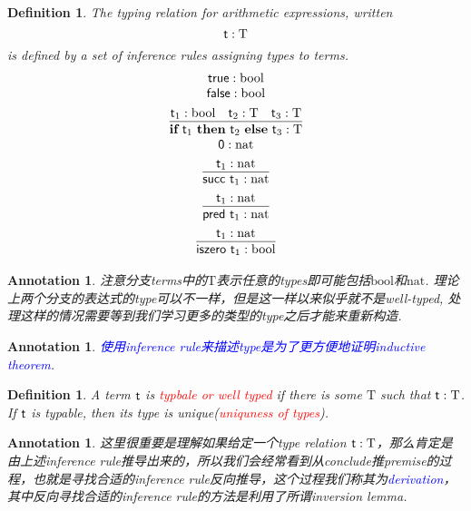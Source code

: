 \documentclass{article}
\theoremstyle{plain}
\newtheorem{definition}[theorem]{Definition}
\newtheorem{annotation}[theorem]{Annotation}
\theoremstyle{nonumberplain}
\newcommand{\termtype}[2]{\ensuremath{#1:#2}}
\newcommand{\term}[1]{\ensuremath\mathsf{#1}}
\newcommand{\true}{\term{true}}
\newcommand{\false}{\term{false}}
\newcommand{\ifelse}[3]{\ensuremath{\textbf{if}~#1~\textbf{then}~#2~\textbf{else}~#3}}
\newcommand{\succt}[1]{\term{succ}~#1}
\newcommand{\pred}[1]{\term{pred}~#1}
\newcommand{\iszero}[1]{\term{iszero}~#1}
\newcommand{\redt}[1]{\textcolor{red}{#1}}
\newcommand{\bluet}[1]{\textcolor{blue}{#1}}
\begin{document}
\begin{definition}
\rm The typing relation for arithmetic expressions, written
$$
\termtype{\term{t}}{\text{T}}
$$
is defined by a set of inference rules assigning types to terms.
$$
\begin{array}{c}
\termtype{\true}{\text{bool}} \\
\termtype{\false}{\text{bool}} \\[0.5em]
\infer{\termtype{\ifelse{\term{t}_1}{\term{t}_2}{\term{t}_3}}{\text{T}}}{\termtype{\term{t}_1}{\text{bool}} & \termtype{\term{t}_2}{\text{T}} & \termtype{\term{t}_3}{\text{T}}} \\
\termtype{\term{0}}{\text{nat}} \\[0.5em]
\infer{\termtype{\succt{\term{t}_1}}{\text{nat}}} {\termtype{\term{t}_1}{\text{nat}}}\\[0.5em]
\infer{\termtype{\pred{\term{t}_1}}{\text{nat}}} {\termtype{\term{t}_1}{\text{nat}}}\\[0.5em]
\infer{\termtype{\iszero{\term{t}_1}}{\text{bool}}} {\termtype{\term{t}_1}{\text{nat}}}\\
\end{array} 
$$
\end{definition}


\begin{annotation}
\rm 注意分支terms中的$\text{T}$表示任意的types即可能包括$\text{bool}$和$\text{nat}$. 理论上两个分支的表达式的type可以不一样，但是这一样以来似乎就不是well-typed, 处理这样的情况需要等到我们学习更多的类型的type之后才能来重新构造. 
\end{annotation}

\begin{annotation}
\rm \bluet{使用inference rule来描述type是为了更方便地证明inductive theorem}.
\end{annotation}

\begin{definition}
\rm A term $\term{t}$ is \redt{typbale or well typed} if there is some $\text{T}$ such that $\termtype{\term{t}}{\text{T}}$. If $\term{t}$ is typable, then its type is unique(\redt{uniquness of types}). 
\end{definition}

\begin{annotation}
\rm 这里很重要是理解如果给定一个type relation $\termtype{\term{t}}{\text{T}}$，那么肯定是由上述inference rule推导出来的，所以我们会经常看到从conclude推premise的过程，也就是寻找合适的inference rule反向推导，这个过程我们称其为\bluet{derivation}，其中反向寻找合适的inference rule的方法是利用了所谓inversion lemma. 
\end{annotation}
\end{document}
